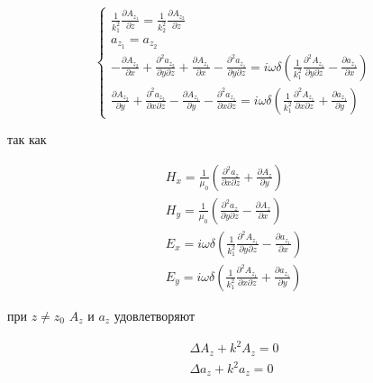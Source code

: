 	\begin{equation}
		\begin{cases}
			\frac{1}{k_1^2} \frac{\partial A_{z_1}}{\partial z} = \frac{1}{k_2^2} \frac{\partial A_{z_2}}{\partial z} \\
			
			a_{z_1} = a_{z_2} \\
			
			-\frac{\partial A_{z_2}}{\partial x} + \frac{\partial^2 a_{z_2}}{\partial y \partial z} + \frac{\partial A_{z_1}}{\partial x} - \frac{\partial^2 a_{z_1}}{\partial y \partial z} = i \omega \delta (\frac{1}{k_1^2} \frac{\partial^2 A_{z_1}}{\partial y \partial z} - \frac{\partial a_{z_1}}{\partial x}) \\
			
			\frac{\partial A_{z_2}}{\partial y} + \frac{\partial^2 a_{z_2}}{\partial x \partial z} - \frac{\partial A_{z_1}}{\partial y} - \frac{\partial^2 a_{z_1}}{\partial x \partial z} = i \omega \delta (\frac{1}{k_1^2} \frac{\partial^2 A_{z_1}}{\partial x \partial z} + \frac{\partial a_{z_1}}{\partial y})
			
			
		\end{cases}
	\end{equation}
	
	
	так как 
	
	\begin{equation}
		\begin{aligned}
			H_x = \frac{1}{\mu_0} (\frac{\partial ^ 2 a_z}{\partial x \partial z} + \frac{\partial A_z}{\partial y}) \\
			H_y = \frac{1}{\mu_0} (\frac{\partial ^ 2 a_z}{\partial y \partial z} - \frac{\partial A_z}{\partial x}) \\
			E_x = i \omega \delta (\frac{1}{k_1^2} \frac{\partial^2 A_{z_1}}{\partial y \partial z} - \frac{\partial a_{z_1}}{\partial x}) \\			
			E_y = i \omega \delta (\frac{1}{k_1^2} \frac{\partial^2 A_{z_1}}{\partial x \partial z} + \frac{\partial a_{z_1}}{\partial y})
		\end{aligned}
	\end{equation}
	
	при $z \neq z_0$ $A_z$ и $a_z$ удовлетворяют 
	
	\begin{equation}
		\begin{aligned}
			\Delta A_z + k^2 A_z = 0 \\
			\Delta a_z + k^2 a_z = 0
		\end{aligned}
	\end{equation}
	
